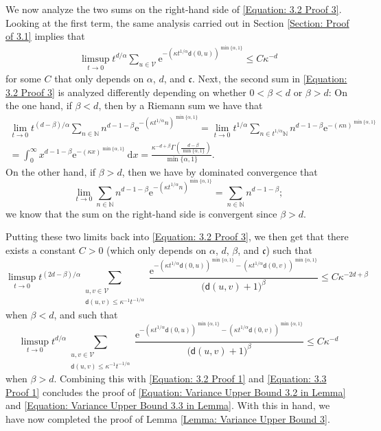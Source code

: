 \documentclass{amsart}
\numberwithin{equation}{section}
\theoremstyle{definition}
\newcommand\al{\alpha}
\newcommand\be{\beta}
\newcommand\ka{\kappa}
\renewcommand\d{~\mathrm d}
\newcommand\mbb{\mathbb}
\newcommand\mf{\mathfrak}
\newcommand\mr{\mathrm}
\newcommand\ms{\mathscr}
\newcommand\msf{\mathsf}
\begin{document}
%

We now analyze the two sums on the right-hand side of \eqref{Equation: 3.2 Proof 3}.
Looking at the first term, the same analysis carried out in Section \ref{Section: Proof of 3.1} implies that
\begin{align*}
\label{Equation: 3.x Proof 3}
\limsup_{t\to0}t^{d/\al}\sum_{u\in\ms V}\mr e^{-(\ka t^{1/\al}\msf d(0,u))^{\min\{\al,1\}}}\leq C\ka^{-d}
\end{align*}
for some $C$ that only depends on $\al$, $d$, and $\mf c$.
Next, the second sum in \eqref{Equation: 3.2 Proof 3} is analyzed differently depending on whether $0<\be<d$ or $\be>d$:
On the one hand, if $\be<d$, then by a Riemann sum we have that
\begin{multline*}
\lim_{t\to0}t^{(d-\be)/\al}\sum_{n\in \mbb N}n^{d-1-\be}\mr e^{-(\ka t^{1/\al} n)^{\min\{\al,1\}}}
=\lim_{t\to0}t^{1/\al}\sum_{n\in t^{1/\al}\mbb N}n^{d-1-\be}\mr e^{-(\ka n)^{\min\{\al,1\}}}\\
=\int_0^\infty x^{d-1-\be}\mr e^{-(\ka x)^{\min\{\al,1\}}}\d x
=\frac{\kappa ^{-d+\be} \Gamma \left(\frac{d-\beta }{\min\{\al,1\}}\right)}{\min\{\al,1\}}.
\end{multline*}
On the other hand, if $\be>d$, then we have by dominated convergence that
\[\lim_{t\to0}\sum_{n\in \mbb N}n^{d-1-\be}\mr e^{-(\ka t^{1/\al} n)^{\min\{\al,1\}}}
=\sum_{n\in \mbb N}n^{d-1-\be};\]
we know that the sum on the right-hand side is convergent since $\be>d$.

%

Putting these two limits back into \eqref{Equation: 3.2 Proof 3}, we then get that there exists a constant $C>0$
(which only depends on $\al$, $d$, $\be$, and $\mf c$) such that
\[\limsup_{t\to0}t^{(2d-\be)/\al}\sum_{\substack{u,v\in\ms V\\\msf d(u,v)\leq \ka^{-1}t^{-1/\al}}}\frac{\mr e^{-(\ka t^{1/\al}\msf d(0,u))^{\min\{\al,1\}}-(\ka t^{1/\al}\msf d(0,v))^{\min\{\al,1\}}}}{
\big(\msf d(u,v)+1\big)^{\be}}\leq C\ka^{-2d+\be}\]
when $\be<d$, and such that
\[\limsup_{t\to0}t^{d/\al}\sum_{\substack{u,v\in\ms V\\\msf d(u,v)\leq \ka^{-1}t^{-1/\al}}}\frac{\mr e^{-(\ka t^{1/\al}\msf d(0,u))^{\min\{\al,1\}}-(\ka t^{1/\al}\msf d(0,v))^{\min\{\al,1\}}}}{
\big(\msf d(u,v)+1\big)^{\be}}\leq C\ka^{-d}\]
when $\be>d$.
Combining this with \eqref{Equation: 3.2 Proof 1} and \eqref{Equation: 3.3 Proof 1} concludes the proof of \eqref{Equation: Variance Upper Bound 3.2 in Lemma}
and \eqref{Equation: Variance Upper Bound 3.3 in Lemma}.
With this in hand, we have now completed the proof of Lemma \ref{Lemma: Variance Upper Bound 3}.
\end{document}
